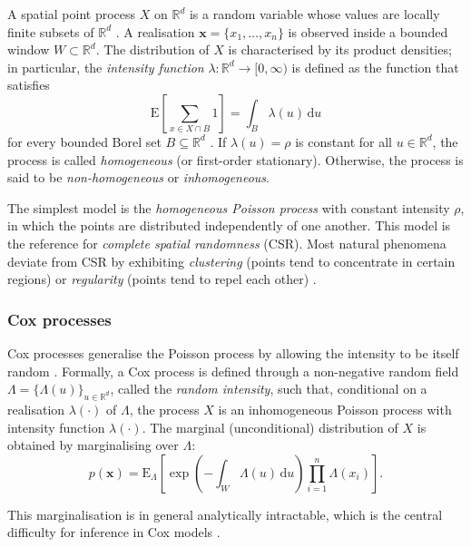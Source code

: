 \documentclass[a4paper,fleqn]{cas-sc}
\numberwithin{equation}{section}
\begin{document}
A spatial point process $X$ on $\mathbb{R}^d$ is a random variable
whose values are locally finite subsets of $\mathbb{R}^d$
\citep{DaleyVereJones2008}. A realisation
$\mathbf{x}=\{x_1,\ldots,x_n\}$ is observed inside a bounded window
$W\subset\mathbb{R}^d$. The distribution of $X$ is characterised by its
product densities; in particular, the \emph{intensity function}
$\lambda\colon\mathbb{R}^d\to[0,\infty)$ is defined as the function
that satisfies
\begin{equation}
    \mathrm{E}\!\left[\sum_{x\in X\cap B}\!1\right]
    = \int_B \lambda(u)\,\mathrm{d}u
    \label{eq:intensity_def}
\end{equation}
for every bounded Borel set $B\subseteq\mathbb{R}^d$
\citep{MollerWaagepetersen2004}. If $\lambda(u)=\rho$ is constant for
all $u\in\mathbb{R}^d$, the process is called \emph{homogeneous} (or
first-order stationary). Otherwise, the process is said to be
\emph{non-homogeneous} or \emph{inhomogeneous}.

The simplest model is the \emph{homogeneous Poisson process} with
constant intensity $\rho$, in which the points are distributed
independently of one another. This model is the reference for
\emph{complete spatial randomness} (CSR). Most natural phenomena
deviate from CSR by exhibiting \emph{clustering} (points tend to
concentrate in certain regions) or \emph{regularity} (points tend to
repel each other) \citep{Diggle2014, spatstat}.

\subsubsection{Cox processes}

Cox processes generalise the Poisson process by allowing the intensity
to be itself random \citep{Cox1955}. Formally, a Cox process is defined
through a non-negative random field
$\Lambda=\{\Lambda(u)\}_{u\in\mathbb{R}^d}$, called the \emph{random
intensity}, such that, conditional on a realisation $\lambda(\cdot)$
of $\Lambda$, the process $X$ is an inhomogeneous Poisson process with
intensity function $\lambda(\cdot)$. The marginal (unconditional)
distribution of $X$ is obtained by marginalising over $\Lambda$:
\begin{equation}
    p(\mathbf{x}) = \mathrm{E}_{\Lambda}\!\left[
    \exp\!\left(-\int_W\!\Lambda(u)\,\mathrm{d}u\right)
    \prod_{i=1}^{n}\Lambda(x_i)\right].
    \label{eq:cox_likelihood}
\end{equation}

This marginalisation is in general analytically intractable, which is
the central difficulty for inference in Cox models
\citep{MollerWaagepetersen2004}.
\end{document}
